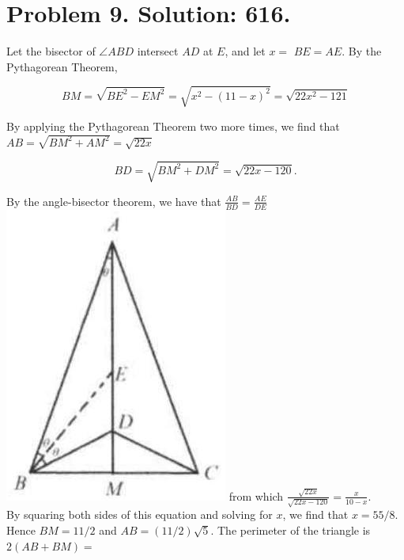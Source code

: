\documentclass[10pt]{article}
\begin{document}
\section*{Problem 9. Solution: 616.}
Let the bisector of \(\angle A B D\) intersect \(A D\) at \(E\), and let \(x=\) \(B E=A E\). By the Pythagorean Theorem,

\[
B M=\sqrt{B E^{2}-E M^{2}}=\sqrt{x^{2}-(11-x)^{2}}=\sqrt{22 x^{2}-121}
\]

By applying the Pythagorean Theorem two more times, we find that \(A B=\sqrt{B M^{2}+A M^{2}}=\sqrt{22 x}\)

\[
B D=\sqrt{B M^{2}+D M^{2}}=\sqrt{22 x-120} .
\]

By the angle-bisector theorem, we have that \(\frac{A B}{B D}=\frac{A E}{D E}\)\\
\includegraphics[max width=\textwidth]{2025_04_17_97bc1f7e44d93c271a88g-070(1)} from which \(\frac{\sqrt{22 x}}{\sqrt{22 x-120}}=\frac{x}{10-x}\).\\
By squaring both sides of this equation and solving for \(x\), we find that \(x=55 / 8\). Hence \(B M=11 / 2\) and \(A B=(11 / 2) \sqrt{5}\). The perimeter of the triangle is \(2(A B+B M)=\)
\end{document}
